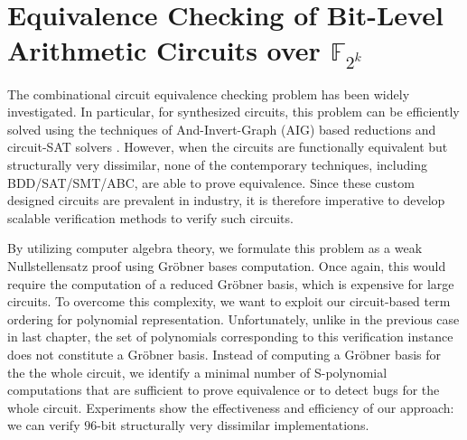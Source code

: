 \chapter{Equivalence Checking of Bit-Level Arithmetic Circuits over $\mathbb{F}_{2^k}$} \label{ch:ecbit}




The combinational circuit equivalence checking problem has been widely investigated. 
In particular, for synthesized circuits, this problem can
be efficiently solved using the techniques of And-Invert-Graph (AIG) 
based reductions \cite{abc} and circuit-SAT solvers \cite{csat}. 
However, when the circuits are functionally equivalent 
but structurally very dissimilar, none of the contemporary techniques, 
including BDD/SAT/SMT/ABC, are able to prove equivalence. 
Since these custom designed circuits are prevalent in industry, 
it is therefore imperative to develop scalable verification methods to verify such circuits. 

By utilizing computer algebra theory, we formulate this problem as a weak Nullstellensatz proof using Gr\"obner bases computation. 
Once again, this would require the computation of a reduced Gr\"obner basis, which is expensive for large circuits. 
To overcome this complexity, we want to exploit our circuit-based term ordering for polynomial representation. 
Unfortunately, unlike in the previous case in last chapter, the set of polynomials corresponding to this verification instance does 
not constitute a Gr\"obner basis. Instead of computing a Gr\"obner basis for the the whole circuit, 
we identify a minimal number of S-polynomial computations that are sufficient to prove equivalence or 
to detect bugs for the whole circuit.
Experiments show the effectiveness and efficiency of our approach: 
we can verify $96$-bit structurally very dissimilar implementations.

